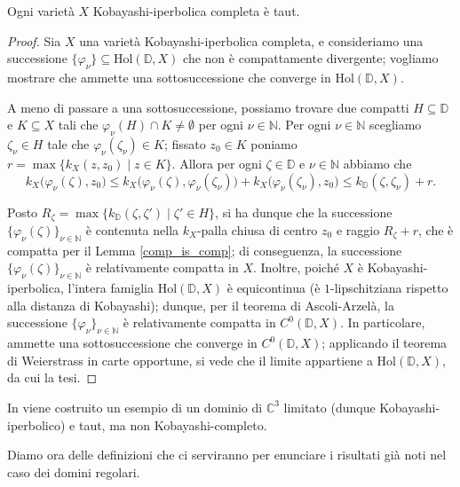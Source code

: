 \begin{prop} \label{comp_is_taut}
    Ogni varietà $X$ Kobayashi-iperbolica completa è taut.
\end{prop}

\begin{proof}
    Sia $X$ una varietà Kobayashi-iperbolica completa, e consideriamo una successione $\{\varphi_\nu\}\subseteq\text{Hol}(\mathbb{D},X)$ che non è compattamente divergente; vogliamo mostrare che ammette una sottosuccessione che converge in $\text{Hol}(\mathbb{D},X)$.

    A meno di passare a una sottosuccessione, possiamo trovare due compatti $H\subseteq\mathbb{D}$ e $K\subseteq X$ tali che $\varphi_\nu(H)\cap K\not=\emptyset$ per ogni $\nu\in\mathbb{N}$. Per ogni $\nu\in\mathbb{{N}}$ scegliamo $\zeta_\nu\in H$ tale che $\varphi_\nu(\zeta_\nu)\in K$; fissato $z_0\in K$ poniamo $r=\max\{k_X(z,z_0)\mid z\in K\}$. Allora per ogni $\zeta\in\mathbb{D}$ e $\nu\in\mathbb{N}$ abbiamo che
    $$k_X\big(\varphi_\nu(\zeta),z_0\big) \le k_X\big(\varphi_\nu(\zeta),\varphi_\nu(\zeta_\nu)\big)+k_X\big(\varphi_\nu(\zeta_\nu),z_0\big) \le k_{\mathbb{D}} (\zeta,\zeta_\nu)+r.$$

    Posto $R_\zeta=\max\{k_{\mathbb{D}}(\zeta,\zeta')\mid \zeta'\in H\}$, si ha dunque che la successione $\{\varphi_\nu(\zeta)\}_{\nu\in\mathbb{N}}$ è contenuta nella $k_X$-palla chiusa di centro $z_0$ e raggio $R_\zeta+r$, che è compatta per il Lemma \ref{comp_is_comp}; di conseguenza, la successione $\{\varphi_\nu(\zeta)\}_{\nu\in\mathbb{N}}$ è relativamente compatta in $X$. Inoltre, poiché $X$ è Kobayashi-iperbolica, l'intera famiglia $\text{Hol}(\mathbb{D},X)$ è equicontinua (è $1$-lipschitziana rispetto alla distanza di Kobayashi); dunque, per il teorema di Ascoli-Arzelà, la successione $\{\varphi_\nu\}_{\nu\in\mathbb{N}}$ è relativamente compatta in $C^0(\mathbb{D},X)$. In particolare, ammette una sottosuccessione che converge in $C^0(\mathbb{D},X)$; applicando il teorema di Weierstrass in carte opportune, si vede che il limite appartiene a $\text{Hol}(\mathbb{D},X)$, da cui la tesi.
\end{proof}

\begin{ex} \label{rosex}
    In \cite{Rosay} viene costruito un esempio di un dominio di $\mathbb{C}^3$ limitato (dunque Kobayashi-iperbolico) e taut, ma non Kobayashi-completo.
\end{ex}

Diamo ora delle definizioni che ci serviranno per enunciare i risultati già noti nel caso dei domini regolari.


